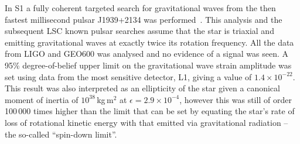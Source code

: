 \documentclass{article}
\begin{document}
In S1 a fully coherent targeted search for gravitational waves from the then
fastest millisecond pulsar J1939+2134 was performed~\cite{Abbott:2004d}. This
analysis and the subsequent LSC known pulsar searches assume that the star is
triaxial and emitting gravitational waves at exactly twice its rotation
frequency. All the data from LIGO and GEO600 was analysed and no evidence of a
signal was seen. A 95\% degree-of-belief upper limit on the gravitational wave
strain amplitude was set using data from the most sensitive detector, L1, giving
a value of $1.4\times10^{-22}$. This result was also interpreted as an
ellipticity of the star given a canonical moment of inertia of
$10^{38}$\,kg\,m$^2$ at $\epsilon = 2.9\times10^{-4}$, however this was still of
order 100\,000 times higher than the limit that can be set by equating the
star's rate of loss of rotational kinetic energy with that emitted via
gravitational radiation -- the so-called ``spin-down limit''.
\end{document}
